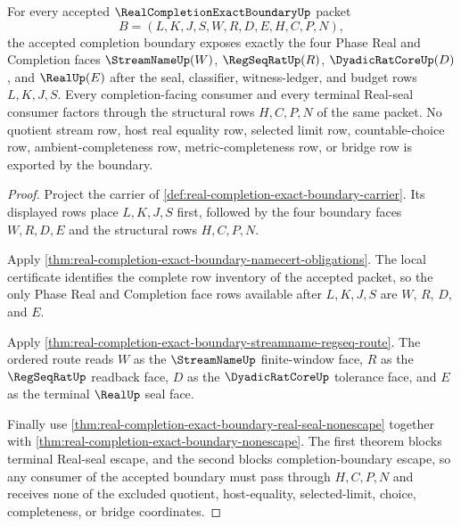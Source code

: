 \begin{theorem}
\label{thm:real-completion-exact-boundary-four-face-exactness}
For every accepted $\RealCompletionExactBoundaryUp$ packet
$$
B=(L,K,J,S,W,R,D,E,H,C,P,N),
$$
the accepted completion boundary exposes exactly the four Phase Real and Completion faces $\StreamNameUp(W)$, $\RegSeqRatUp(R)$, $\DyadicRatCoreUp(D)$, and $\RealUp(E)$ after the seal, classifier, witness-ledger, and budget rows $L,K,J,S$. Every completion-facing consumer and every terminal Real-seal consumer factors through the structural rows $H,C,P,N$ of the same packet. No quotient stream row, host real equality row, selected limit row, countable-choice row, ambient-completeness row, metric-completeness row, or bridge row is exported by the boundary.
\end{theorem}
\begin{proof}
Project the carrier of \autoref{def:real-completion-exact-boundary-carrier}. Its displayed rows place $L,K,J,S$ first, followed by the four boundary faces $W,R,D,E$ and the structural rows $H,C,P,N$.

Apply \autoref{thm:real-completion-exact-boundary-namecert-obligations}. The local certificate identifies the complete row inventory of the accepted packet, so the only Phase Real and Completion face rows available after $L,K,J,S$ are $W$, $R$, $D$, and $E$.

Apply \autoref{thm:real-completion-exact-boundary-streamname-regseq-route}. The ordered route reads $W$ as the $\StreamNameUp$ finite-window face, $R$ as the $\RegSeqRatUp$ readback face, $D$ as the $\DyadicRatCoreUp$ tolerance face, and $E$ as the terminal $\RealUp$ seal face.

Finally use \autoref{thm:real-completion-exact-boundary-real-seal-nonescape} together with \autoref{thm:real-completion-exact-boundary-nonescape}. The first theorem blocks terminal Real-seal escape, and the second blocks completion-boundary escape, so any consumer of the accepted boundary must pass through $H,C,P,N$ and receives none of the excluded quotient, host-equality, selected-limit, choice, completeness, or bridge coordinates.
\end{proof}

